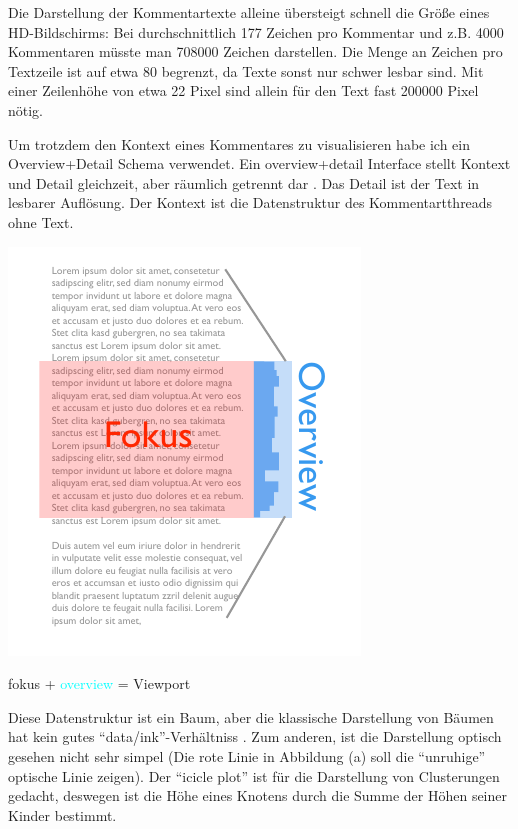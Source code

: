 \documentclass[nobib, nohyper, a4paper,openany]{tufte-book}
\newcommand*{\ca}[1]{\textcolor{cyan}{#1}}
\newcommand*{\cb}[1]{\textcolor{RedOrange}{#1}}
\begin{document}
Die Darstellung der Kommentartexte alleine übersteigt schnell die Größe eines HD-Bildschirms:
Bei durchschnittlich 177 Zeichen pro Kommentar und z.B. 4000 Kommentaren müsste man 
708000 Zeichen darstellen. Die Menge an Zeichen pro Textzeile ist auf etwa 80 begrenzt,
da Texte sonst nur schwer lesbar sind. Mit einer Zeilenhöhe von etwa 22 Pixel
sind allein für den Text fast 200000 Pixel nötig.

Um trotzdem den Kontext eines Kommentares zu visualisieren habe ich ein Overview+Detail 
Schema verwendet. Ein overview+detail Interface stellt Kontext und Detail gleichzeit, aber 
räumlich getrennt dar \cite{CockburnReviewOverviewDetail2009}.
Das Detail ist der Text in lesbarer Auflösung.
Der Kontext ist die Datenstruktur des Kommentartthreads ohne Text.

\begin{marginfigure}
  \includegraphics[width=\textwidth]{figures/Kontext.pdf}
  \caption{\cb{fokus} + \ca{overview} = Viewport}
  \label{figcontext}
\end{marginfigure}

Diese Datenstruktur ist ein Baum, aber die klassische Darstellung von Bäumen 
hat kein gutes ``data/ink''-Verhältniss \cite{TufteVisualDisplayQuantitative2009}.
Zum anderen, ist die Darstellung optisch gesehen nicht sehr simpel
(Die rote Linie in Abbildung (a) soll die ``unruhige'' optische Linie zeigen).
Der ``icicle plot'' ist für die Darstellung von Clusterungen gedacht,
deswegen ist die Höhe eines Knotens durch die Summe der Höhen seiner Kinder bestimmt.
\end{document}
